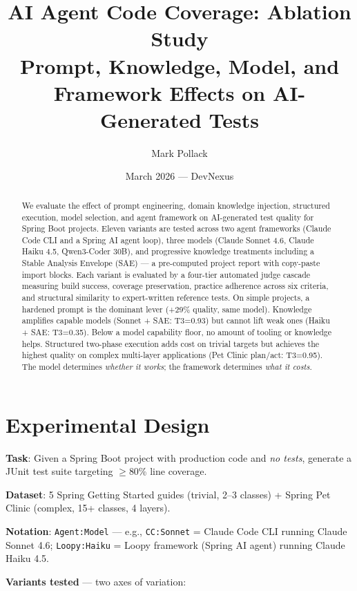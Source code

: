 \documentclass[11pt,a4paper]{article}
\title{AI Agent Code Coverage: Ablation Study\\
\large Prompt, Knowledge, Model, and Framework Effects on AI-Generated Tests}
\author{Mark Pollack}
\date{March 2026 --- DevNexus}
\begin{document}
\maketitle

\begin{abstract}
We evaluate the effect of prompt engineering, domain knowledge injection,
structured execution, model selection, and agent framework on AI-generated
test quality for Spring Boot projects. Eleven variants are tested across
two agent frameworks (Claude Code CLI and a Spring AI agent loop), three
models (Claude Sonnet 4.6, Claude Haiku 4.5, Qwen3-Coder 30B), and
progressive knowledge treatments including a Stable Analysis Envelope (SAE)
--- a pre-computed project report with copy-paste import blocks.
Each variant is evaluated by a four-tier automated judge cascade measuring
build success, coverage preservation, practice adherence across six criteria,
and structural similarity to expert-written reference tests.
On simple projects, a hardened prompt is the dominant lever (+29\% quality,
same model). Knowledge amplifies capable models (Sonnet + SAE: T3=0.93)
but cannot lift weak ones (Haiku + SAE: T3=0.35). Below a model capability
floor, no amount of tooling or knowledge helps. Structured two-phase
execution adds cost on trivial targets but achieves the highest quality on
complex multi-layer applications (Pet Clinic plan/act: T3=0.95). The model
determines \emph{whether it works}; the framework determines \emph{what it costs}.
\end{abstract}

\tableofcontents
\newpage

\section{Experimental Design}

\textbf{Task}: Given a Spring Boot project with production code and \emph{no tests},
generate a JUnit test suite targeting $\geq$80\% line coverage.

\textbf{Dataset}: 5 Spring Getting Started guides (trivial, 2--3 classes) +
Spring Pet Clinic (complex, 15+ classes, 4 layers).

\textbf{Notation}: \texttt{Agent:Model} --- e.g., \texttt{CC:Sonnet} = Claude Code CLI
running Claude Sonnet 4.6; \texttt{Loopy:Haiku} = Loopy framework (Spring AI agent)
running Claude Haiku 4.5.

\textbf{Variants tested} --- two axes of variation:
\end{document}

